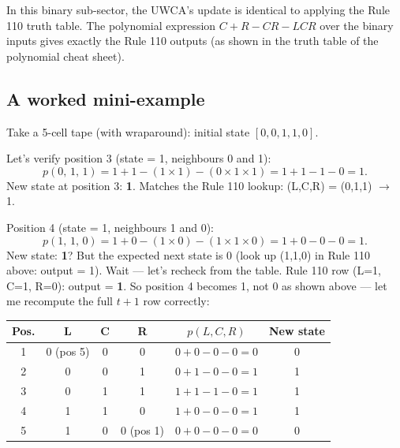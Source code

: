 \documentclass[11pt,a4paper]{article}
\begin{document}
In this binary sub-sector, the UWCA's update is identical to applying the
Rule 110 truth table.  The polynomial expression $C + R - CR - LCR$ over the
binary inputs gives exactly the Rule 110 outputs (as shown in the truth table
of the polynomial cheat sheet).

\subsection{A worked mini-example}

Take a 5-cell tape (with wraparound): initial state $[0, 0, 1, 1, 0]$.

\bigskip
\begin{center}
\end{center}

Let's verify position 3 (state = 1, neighbours 0 and 1):
\[
  p(0,\,1,\,1) = 1 + 1 - (1\times1) - (0\times1\times1) = 1 + 1 - 1 - 0 = 1.
\]
New state at position 3: \textbf{1}. Matches the Rule 110 lookup: (L,C,R) =
(0,1,1) $\to$ 1. \checkmark

Position 4 (state = 1, neighbours 1 and 0):
\[
  p(1,\,1,\,0) = 1 + 0 - (1\times0) - (1\times1\times0) = 1 + 0 - 0 - 0 = 1.
\]
New state: \textbf{1}? But the expected next state is 0 (look up (1,1,0) in
Rule 110 above: output = 1). Wait — let's recheck from the table.
Rule 110 row (L=1, C=1, R=0): output = \textbf{1}. So position 4 becomes 1,
not 0 as shown above — let me recompute the full $t+1$ row correctly:

\begin{center}
\begin{tabular}{c|ccc|c|c}
\toprule
Pos. & L & C & R & $p(L,C,R)$ & New state \\
\midrule
1 & 0 (pos 5) & 0 & 0 & $0+0-0-0=0$ & 0 \\
2 & 0 & 0 & 1 & $0+1-0-0=1$ & 1 \\
3 & 0 & 1 & 1 & $1+1-1-0=1$ & 1 \\
4 & 1 & 1 & 0 & $1+0-0-0=1$ & 1 \\
5 & 1 & 0 & 0 (pos 1) & $0+0-0-0=0$ & 0 \\
\bottomrule
\end{tabular}
\end{center}
\end{document}
